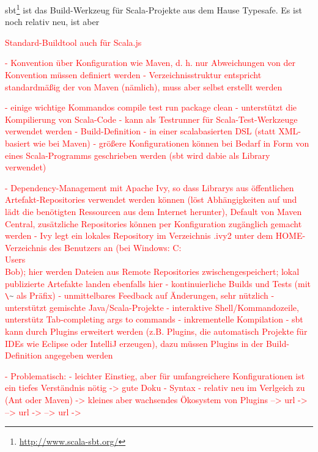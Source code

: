 \documentclass[a4paper, 12pt, hidelinks, listof=totoc, listoftables=totoc, bibliography=totoc]{scrreprt}
\newcommand{\code}[1]{\lstinline[language=Scala, style=inline]|#1|}
\newcommand{\TODO}[1]{\textcolor{red}{#1}\newline}
\begin{document}
sbt\footnote{\url{http://www.scala-sbt.org/}} ist das Build-Werkzeug für Scala-Projekte aus dem Hause Typesafe. Es ist noch relativ neu, ist aber 

\TODO{Standard-Buildtool auch für Scala.js}

\TODO{- Konvention über Konfiguration wie Maven, d. h. nur Abweichungen von der Konvention müssen definiert werden}
\TODO{- Verzeichnisstruktur entspricht standardmäßig der von Maven (nämlich), muss aber selbst erstellt werden}

\TODO{- einige wichtige Kommandos}
\TODO{  compile
  test
  run
  package
  clean
}
\TODO{- unterstützt die Kompilierung von Scala-Code}
\TODO{- kann als Testrunner für Scala-Test-Werkzeuge verwendet werden}
\TODO{- Build-Definition}
\TODO{  - in einer scalabasierten DSL (statt XML-basiert wie bei Maven)}
\TODO{  - größere Konfigurationen können bei Bedarf in Form von eines Scala-Programms geschrieben werden (sbt wird dabie als Library verwendet)}

\TODO{- Dependency-Management mit Apache Ivy, so dass Librarys aus öffentlichen Artefakt-Repositories verwendet werden können (löst Abhängigkeiten auf und lädt die benötigten Ressourcen aus dem Internet herunter), Default von Maven Central, zusätzliche Repositories können per Konfiguration zugänglich gemacht werden}
\TODO{  - Ivy legt ein lokales Repository im Verzeichnis .ivy2 unter dem HOME-Verzeichnis des Benutzers an (bei Windows: C:\\Users\\Bob); hier werden Dateien aus Remote Repositories zwischengespeichert; lokal publizierte Artefakte landen ebenfalls hier}
\TODO{- kontinuierliche Builds und Tests (mit \code{\~} als Präfix) - unmittelbares Feedback auf Änderungen, sehr nützlich}
\TODO{- unterstützt gemischte Java/Scala-Projekte}
\TODO{- interaktive Shell/Kommandozeile, unterstütz Tab-completing args to commands}
\TODO{- inkrementelle Kompilation}
\TODO{- sbt kann durch Plugins erweitert werden (z.B. Plugins, die automatisch Projekte für IDEs wie Eclipse oder IntelliJ erzeugen), dazu müssen Plugins in der Build-Definition angegeben werden}

\TODO{- Problematisch:}
\TODO{  - leichter Einstieg, aber für umfangreichere Konfigurationen ist ein tiefes Verständnis nötig -> gute Doku}
\TODO{  - Syntax}
\TODO{  - relativ neu im Verlgeich zu (Ant oder Maven) -> kleines aber wachsendes Ökosystem von Plugins}
\TODO{-->  url -> %
}
\TODO{-->  url -> %
}
\TODO{-->  url -> %
}
\end{document}
